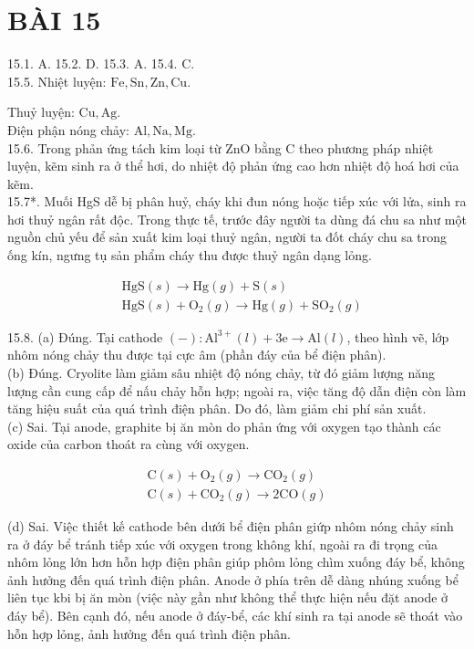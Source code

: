 \documentclass[10pt]{article}
\begin{document}
\section*{BÀI 15}
15.1. A. 15.2. D. 15.3. A. 15.4. C.\\
15.5. Nhiệt luyện: $\mathrm{Fe}, \mathrm{Sn}, \mathrm{Zn}, \mathrm{Cu}$.

Thuỷ luyện: $\mathrm{Cu}, \mathrm{Ag}$.\\
Điện phận nóng chảy: $\mathrm{Al}, \mathrm{Na}, \mathrm{Mg}$.\\
15.6. Trong phản ứng tách kim loại từ ZnO bằng C theo phương pháp nhiệt luyện, kẽm sinh ra ở thể hơi, do nhiệt độ phản ứng cao hơn nhiệt độ hoá hơi của kẽm.\\
15.7*. Muối HgS dễ bị phân huỷ, cháy khi đun nóng hoặc tiếp xúc với lửa, sinh ra hơi thuỷ ngân rất độc. Trong thực tế, trước đây người ta dùng đá chu sa như một nguồn chủ yếu để sản xuất kim loại thuỷ ngân, người ta đốt cháy chu sa trong ống kín, ngưng tụ sản phẩm cháy thu được thuỷ ngân dạng lỏng.

$$
\begin{aligned}
& \mathrm{HgS}(s) \rightarrow \mathrm{Hg}(g)+\mathrm{S}(s) \\
& \mathrm{HgS}(s)+\mathrm{O}_{2}(g) \rightarrow \mathrm{Hg}(g)+\mathrm{SO}_{2}(g)
\end{aligned}
$$

15.8. (a) Đúng. Tại cathode $(-): \mathrm{Al}^{3+}(l)+3 \mathrm{e} \rightarrow \mathrm{Al}(l)$, theo hình vẽ, lớp nhôm nóng chảy thu được tại cực âm (phần đáy của bể điện phân).\\
(b) Đúng. Cryolite làm giảm sâu nhiệt độ nóng chảy, từ đó giảm lượng năng lượng cần cung cấp để nấu chảy hỗn hợp; ngoài ra, việc tăng độ dẫn điện còn làm tăng hiệu suất của quá trình điện phân. Do đó, làm giảm chi phí sản xuất.\\
(c) Sai. Tại anode, graphite bị ăn mòn do phản ứng với oxygen tạo thành các oxide của carbon thoát ra cùng với oxygen.

$$
\begin{gathered}
\mathrm{C}(s)+\mathrm{O}_{2}(g) \rightarrow \mathrm{CO}_{2}(g) \\
\mathrm{C}(s)+\mathrm{CO}_{2}(g) \rightarrow 2 \mathrm{CO}(g)
\end{gathered}
$$

(d) Sai. Việc thiết kế cathode bên dưới bể điện phân giứp nhôm nóng chảy sinh ra ở đáy bể tránh tiếp xúc với oxygen trong không khí, ngoài ra đi trọng của nhôm lỏng lớn hơn hỗn hợp điện phân giúp phôm lỏng chìm xuống đáy bể, không ảnh hưởng đến quá trình điện phân. Anode ở phía trên dễ dàng nhúng xuống bể liên tục kbi bị ăn mòn (việc này gần như không thể thực hiện nếu đặt anode ở đáy bể). Bên cạnh đó, nếu anode ở đáy-bể, các khí sinh ra tại anode sẽ thoát vào hỗn hợp lỏng, ảnh hưởng đến quá trình điện phân.
\end{document}
